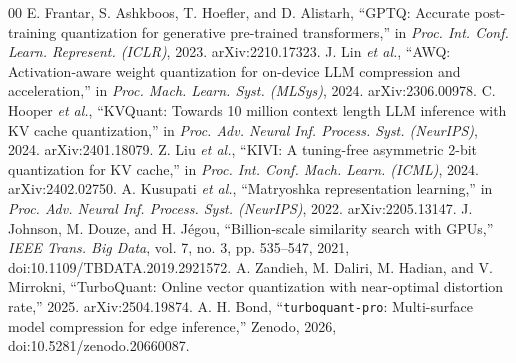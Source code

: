 \documentclass[10pt,conference,compsoc]{IEEEtran}
\begin{document}
\begin{thebibliography}{00}
 E. Frantar, S. Ashkboos, T. Hoefler, and D. Alistarh, ``GPTQ:
Accurate post-training quantization for generative pre-trained transformers,'' in
\emph{Proc. Int. Conf. Learn. Represent. (ICLR)}, 2023. arXiv:2210.17323.
 J. Lin \emph{et al.}, ``AWQ: Activation-aware weight quantization
for on-device LLM compression and acceleration,'' in \emph{Proc. Mach. Learn.
Syst. (MLSys)}, 2024. arXiv:2306.00978.
 C. Hooper \emph{et al.}, ``KVQuant: Towards 10 million context
length LLM inference with KV cache quantization,'' in \emph{Proc. Adv. Neural
Inf. Process. Syst. (NeurIPS)}, 2024. arXiv:2401.18079.
 Z. Liu \emph{et al.}, ``KIVI: A tuning-free asymmetric 2-bit
quantization for KV cache,'' in \emph{Proc. Int. Conf. Mach. Learn. (ICML)},
2024. arXiv:2402.02750.
 A. Kusupati \emph{et al.}, ``Matryoshka representation learning,''
in \emph{Proc. Adv. Neural Inf. Process. Syst. (NeurIPS)}, 2022. arXiv:2205.13147.
 J. Johnson, M. Douze, and H. J\'egou, ``Billion-scale similarity
search with GPUs,'' \emph{IEEE Trans. Big Data}, vol. 7, no. 3, pp. 535--547,
2021, doi:10.1109/TBDATA.2019.2921572.
 A. Zandieh, M. Daliri, M. Hadian, and V. Mirrokni,
``TurboQuant: Online vector quantization with near-optimal distortion rate,''
2025. arXiv:2504.19874.
 A. H. Bond, ``\texttt{turboquant-pro}: Multi-surface
model compression for edge inference,'' Zenodo, 2026,
doi:10.5281/zenodo.20660087.
\end{thebibliography}
\end{document}
